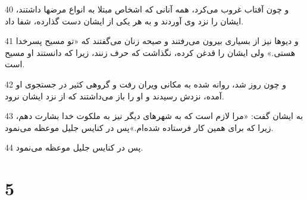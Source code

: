 \par 40 و چون آفتاب غروب می‌کرد، همه آنانی که اشخاص مبتلا به انواع مرضها داشتند، ایشان را نزد وی آوردند و به هر یکی از ایشان دست گذارده، شفا داد.
\par 41 و دیوها نیز از بسیاری بیرون می‌رفتند و صیحه زنان می‌گفتند که «تو مسیح پسرخدا هستی.» ولی ایشان را قدغن کرده، نگذاشت که حرف زنند، زیرا که دانستند او مسیح است.
\par 42 و چون روز شد، روانه شده به مکانی ویران رفت و گروهی کثیر در جستجوی او آمده، نزدش رسیدند و او را باز می‌داشتند که از نزد ایشان نرود.
\par 43 به ایشان گفت: «مرا لازم است که به شهرهای دیگر نیز به ملکوت خدا بشارت دهم، زیرا که برای همین کار فرستاده شده‌ام.»پس در کنایس جلیل موعظه می‌نمود.
\par 44 پس در کنایس جلیل موعظه می‌نمود.

\chapter{5}

